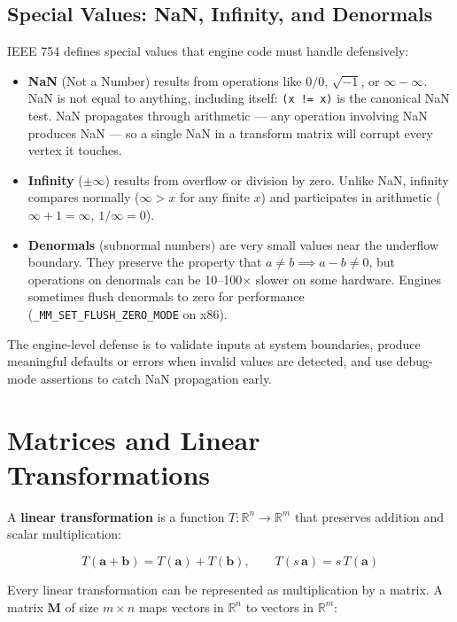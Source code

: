 \documentclass[
  11pt,
  letterpaper,
  DIV=11,
  numbers=noendperiod,
  twoside,
  open=right]{scrreprt}
\providecommand{\tightlist}{%
  \setlength{\itemsep}{0pt}\setlength{\parskip}{0pt}}
\begin{document}
\subsection{Special Values: NaN, Infinity, and
Denormals}\label{special-values-nan-infinity-and-denormals}

IEEE 754 defines special values that engine code must handle
defensively:

\begin{itemize}
\tightlist
\item
  \textbf{NaN} (Not a Number) results from operations like \(0/0\),
  \(\sqrt{-1}\), or \(\infty - \infty\). NaN is not equal to anything,
  including itself: \texttt{(x\ !=\ x)} is the canonical NaN test. NaN
  propagates through arithmetic --- any operation involving NaN produces
  NaN --- so a single NaN in a transform matrix will corrupt every
  vertex it touches.
\item
  \textbf{Infinity} (\(\pm\infty\)) results from overflow or division by
  zero. Unlike NaN, infinity compares normally (\(\infty > x\) for any
  finite \(x\)) and participates in arithmetic (\(\infty + 1 = \infty\),
  \(1 / \infty = 0\)).
\item
  \textbf{Denormals} (subnormal numbers) are very small values near the
  underflow boundary. They preserve the property that
  \(a \neq b \implies a - b \neq 0\), but operations on denormals can be
  10--100× slower on some hardware. Engines sometimes flush denormals to
  zero for performance (\texttt{\_MM\_SET\_FLUSH\_ZERO\_MODE} on x86).
\end{itemize}

The engine-level defense is to validate inputs at system boundaries,
produce meaningful defaults or errors when invalid values are detected,
and use debug-mode assertions to catch NaN propagation early.

\section{Matrices and Linear
Transformations}\label{matrices-and-linear-transformations}

A \textbf{linear transformation} is a function
\(T : \mathbb{R}^n \to \mathbb{R}^m\) that preserves addition and scalar
multiplication:

\[
T(\mathbf{a} + \mathbf{b}) = T(\mathbf{a}) + T(\mathbf{b}), \qquad T(s \, \mathbf{a}) = s \, T(\mathbf{a})
\]

Every linear transformation can be represented as multiplication by a
matrix. A matrix \(\mathbf{M}\) of size \(m \times n\) maps vectors in
\(\mathbb{R}^n\) to vectors in \(\mathbb{R}^m\):
\end{document}
